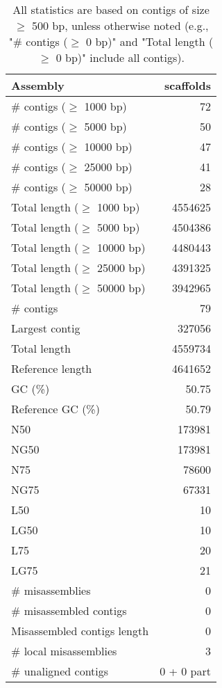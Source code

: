 \documentclass[12pt,a4paper]{article}
\begin{document}
\begin{table}[ht]
\begin{center}
\caption{All statistics are based on contigs of size $\geq$ 500 bp, unless otherwise noted (e.g., "\# contigs ($\geq$ 0 bp)" and "Total length ($\geq$ 0 bp)" include all contigs).}
\begin{tabular}{|l*{1}{|r}|}
\hline
Assembly & scaffolds \\ \hline
\# contigs ($\geq$ 1000 bp) & 72 \\ \hline
\# contigs ($\geq$ 5000 bp) & 50 \\ \hline
\# contigs ($\geq$ 10000 bp) & 47 \\ \hline
\# contigs ($\geq$ 25000 bp) & 41 \\ \hline
\# contigs ($\geq$ 50000 bp) & 28 \\ \hline
Total length ($\geq$ 1000 bp) & 4554625 \\ \hline
Total length ($\geq$ 5000 bp) & 4504386 \\ \hline
Total length ($\geq$ 10000 bp) & 4480443 \\ \hline
Total length ($\geq$ 25000 bp) & 4391325 \\ \hline
Total length ($\geq$ 50000 bp) & 3942965 \\ \hline
\# contigs & 79 \\ \hline
Largest contig & 327056 \\ \hline
Total length & 4559734 \\ \hline
Reference length & 4641652 \\ \hline
GC (\%) & 50.75 \\ \hline
Reference GC (\%) & 50.79 \\ \hline
N50 & 173981 \\ \hline
NG50 & 173981 \\ \hline
N75 & 78600 \\ \hline
NG75 & 67331 \\ \hline
L50 & 10 \\ \hline
LG50 & 10 \\ \hline
L75 & 20 \\ \hline
LG75 & 21 \\ \hline
\# misassemblies & 0 \\ \hline
\# misassembled contigs & 0 \\ \hline
Misassembled contigs length & 0 \\ \hline
\# local misassemblies & 3 \\ \hline
\# unaligned contigs & 0 + 0 part \\ \hline

\end{tabular}
\end{center}
\end{table}
\end{document}
